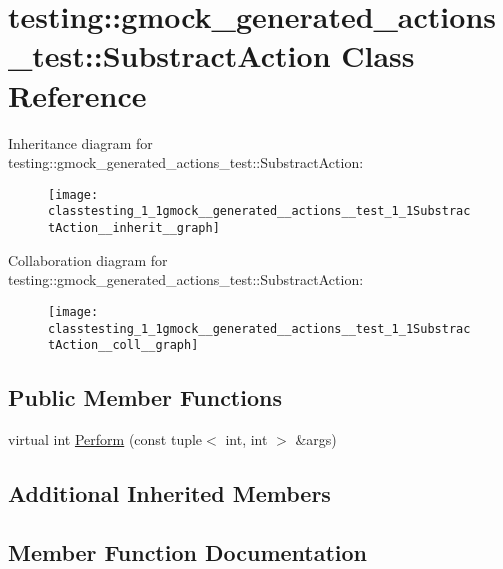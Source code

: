 \hypertarget{classtesting_1_1gmock__generated__actions__test_1_1SubstractAction}{}\section{testing\+:\+:gmock\+\_\+generated\+\_\+actions\+\_\+test\+:\+:Substract\+Action Class Reference}
\label{classtesting_1_1gmock__generated__actions__test_1_1SubstractAction}


Inheritance diagram for testing\+:\+:gmock\+\_\+generated\+\_\+actions\+\_\+test\+:\+:Substract\+Action\+:\nopagebreak
\begin{figure}[H]
\begin{center}
\leavevmode
\texttt{[image: classtesting\_1\_1gmock\_\_generated\_\_actions\_\_test\_1\_1SubstractAction\_\_inherit\_\_graph]}
\end{center}
\end{figure}


Collaboration diagram for testing\+:\+:gmock\+\_\+generated\+\_\+actions\+\_\+test\+:\+:Substract\+Action\+:\nopagebreak
\begin{figure}[H]
\begin{center}
\leavevmode
\texttt{[image: classtesting\_1\_1gmock\_\_generated\_\_actions\_\_test\_1\_1SubstractAction\_\_coll\_\_graph]}
\end{center}
\end{figure}
\subsection*{Public Member Functions}
\begin{DoxyCompactItemize}
\item 
virtual int \hyperlink{classtesting_1_1gmock__generated__actions__test_1_1SubstractAction_ac049ec6196668e17ef7384e08914f2c3}{Perform} (const tuple$<$ int, int $>$ \&args)
\end{DoxyCompactItemize}
\subsection*{Additional Inherited Members}


\subsection{Member Function Documentation}
